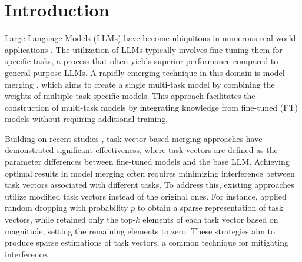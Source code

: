 \section{Introduction} \label{sec:intro}

Large Language Models (LLMs) have become ubiquitous in numerous real-world applications \citep{bommasani_2021_opportunities, zhuang_2020_comprehensive}. The utilization of LLMs typically involves fine-tuning them for specific tasks, a process that often yields superior performance compared to general-purpose LLMs. A rapidly emerging technique in this domain is model merging \citep{garipov_2018_loss, wortsman_2022_model,yu_2024_language}, which aims to create a single multi-task model by combining the weights of multiple task-specific models. This approach facilitates the construction of multi-task models by integrating knowledge from fine-tuned (FT) models without requiring additional training. 

Building on recent studies \citep{ilharco_2022_editing, yadav_2024_ties, yu_2024_language}, task vector-based merging approaches have demonstrated significant effectiveness, where task vectors are defined as the parameter differences between fine-tuned models and the base LLM.
Achieving optimal results in model merging often requires minimizing interference between task vectors associated with different tasks. To address this, existing approaches utilize modified task vectors instead of the original ones. For instance, \citet{yu_2024_language} applied random dropping with probability $p$ to obtain a sparse representation of task vectors, while \citet{yadav_2024_ties} retained only the top-$k$ elements of each task vector based on magnitude, setting the remaining elements to zero. These strategies aim to produce sparse estimations of task vectors, a common technique for mitigating interference.

